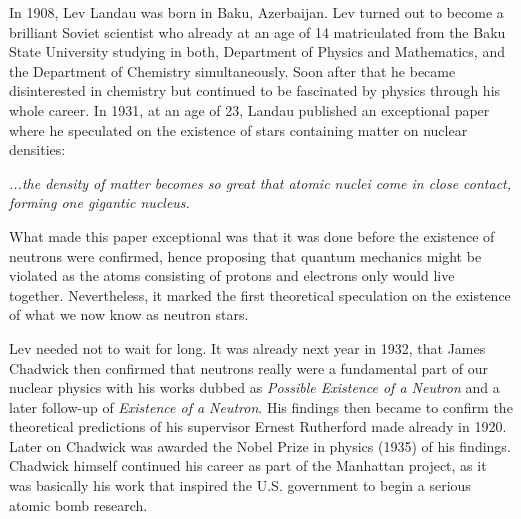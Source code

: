 In 1908, Lev Landau was born in Baku, Azerbaijan.
Lev turned out to become a brilliant Soviet scientist who already at an age of 14 matriculated from the Baku State University studying in both, Department of Physics and Mathematics, and the Department of Chemistry simultaneously.
Soon after that he became disinterested in chemistry but continued to be fascinated by physics through his whole career.
In 1931, at an age of 23, Landau published an exceptional paper where he speculated on the existence of stars containing matter on nuclear densities:\cite{Landau32}
\begin{displayquote}
    \textit{...the density of matter becomes so great that atomic nuclei come in close contact, forming one gigantic nucleus.}
\end{displayquote}
What made this paper exceptional was that it was done before the existence of neutrons were confirmed, hence proposing that quantum mechanics might be violated as the atoms consisting of protons and electrons only would live together.
Nevertheless, it marked the first theoretical speculation on the existence of what we now know as neutron stars.

Lev needed not to wait for long.
It was already next year in 1932, that James Chadwick then confirmed that neutrons really were a fundamental part of our nuclear physics with his works dubbed as \textit{Possible Existence of a Neutron}\cite{Chadwick32a} and a later follow-up of \textit{Existence of a Neutron}\cite{Chadwick32b}.
His findings then became to confirm the theoretical predictions of his supervisor Ernest Rutherford made already in 1920\cite{Rutherford20}.
Later on Chadwick was awarded the Nobel Prize in physics (1935) of his findings.
Chadwick himself continued his career as part of the Manhattan project, as it was basically his work that inspired the U.S. government to begin a serious atomic bomb research.


